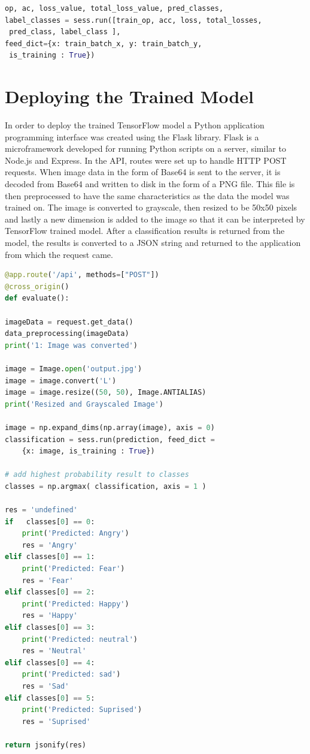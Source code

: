 \begin{lstlisting}[language=python, frame=single]
op, ac, loss_value, total_loss_value, pred_classes, 
label_classes = sess.run([train_op, acc, loss, total_losses,
 pred_class, label_class ], 
feed_dict={x: train_batch_x, y: train_batch_y,
 is_training : True})
\end{lstlisting}



\section{Deploying the Trained Model}
In order to deploy the trained TensorFlow model a Python application programming interface was created using the Flask library. Flask is a microframework developed for running Python scripts on a server, similar to Node.js and Express. In the API, routes were set up to handle HTTP POST requests. When image data in the form of Base64 is sent to the server, it is decoded from Base64 and written to disk in the form of a PNG file. This file is then preprocessed to have the same characteristics as the data the model was trained on. The image is converted to grayscale, then resized to be 50x50 pixels and lastly a new dimension is added to the image so that it can be interpreted by TensorFlow trained model. After a classification results is returned from the model, the results is converted to a JSON string and returned to the application from which the request came.

\begin{lstlisting}[language=python, frame=single]
@app.route('/api', methods=["POST"])
@cross_origin()
def evaluate():

imageData = request.get_data()
data_preprocessing(imageData)
print('1: Image was converted')

image = Image.open('output.jpg')
image = image.convert('L')
image = image.resize((50, 50), Image.ANTIALIAS)
print('Resized and Grayscaled Image') 

image = np.expand_dims(np.array(image), axis = 0)
classification = sess.run(prediction, feed_dict = 
	{x: image, is_training : True})  
	
# add highest probability result to classes
classes = np.argmax( classification, axis = 1 )

res = 'undefined'
if   classes[0] == 0:
	print('Predicted: Angry')
	res = 'Angry'
elif classes[0] == 1:
	print('Predicted: Fear')
	res = 'Fear'
elif classes[0] == 2:
	print('Predicted: Happy')
	res = 'Happy'
elif classes[0] == 3:
	print('Predicted: neutral')
	res = 'Neutral'
elif classes[0] == 4:
	print('Predicted: sad')
	res = 'Sad'
elif classes[0] == 5:
	print('Predicted: Suprised')
	res = 'Suprised'

return jsonify(res)
\end{lstlisting}

